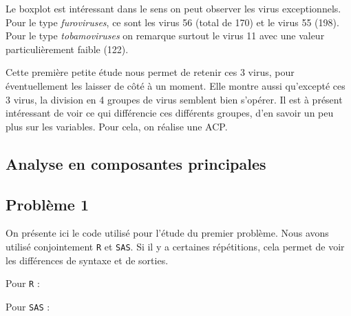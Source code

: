\documentclass[a4paper]{report}
\begin{document}
Le boxplot est intéressant dans le sens on peut observer les virus exceptionnels. Pour le type \emph{furoviruses}, ce sont les virus 56 (total de 170) et le virus 55 (198). Pour le type \emph{tobamoviruses} on remarque surtout le virus 11 avec une valeur particulièrement faible (122).

Cette première petite étude nous permet de retenir ces 3 virus, pour éventuellement les laisser de côté à un moment. Elle montre aussi qu'excepté ces 3 virus, la division en 4 groupes de virus semblent bien s'opérer. Il est à présent intéressant de voir ce qui différencie ces différents groupes, d'en savoir un peu plus sur les variables. Pour cela, on réalise une ACP. 

\section{Analyse en composantes principales}






 \begin{appendix}
 \chapter{Problème 1}
  \label{Pb1}
 On présente ici le code utilisé pour l'étude du premier problème. Nous avons utilisé conjointement \verb|R| et \verb|SAS|. Si il y a certaines répétitions, cela permet de voir les différences de syntaxe et de sorties.
 
 Pour \verb|R| : 
\lstset{frame=single, xrightmargin =1cm , xleftmargin =1 cm}


Pour \verb|SAS| : 

\end{appendix}
\end{document}
